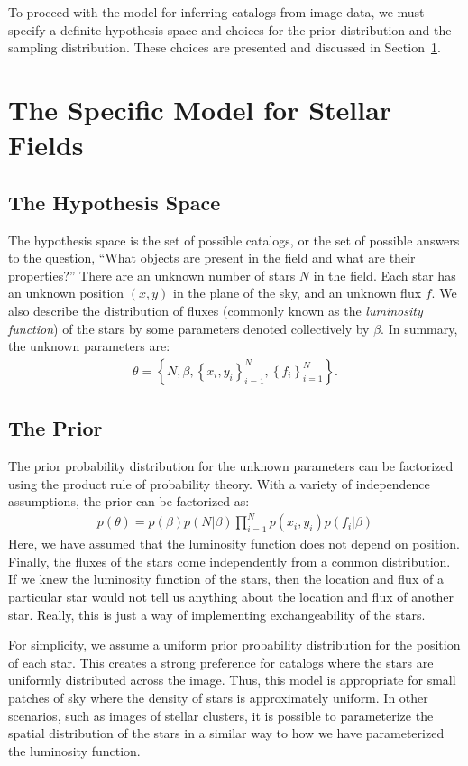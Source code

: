 \documentclass[manuscript]{aastex}
\begin{document}
To proceed with the model for inferring catalogs from image data, we must
specify a definite hypothesis space and choices for the prior distribution
and the sampling distribution. These choices are presented and discussed in
Section~\ref{sec:model}.

\section{The Specific Model for Stellar Fields}\label{sec:model}
\subsection{The Hypothesis Space}
The hypothesis space is the set of possible catalogs, or the set of possible
answers to the question, ``What objects are present in the field and
what are their properties?'' There are an unknown number of stars
$N$ in the field. Each star has an unknown
position $(x,y)$ in the plane of the sky, and an unknown flux $f$. We also
describe the distribution of fluxes (commonly known as the {\it luminosity
function}) of the stars by some parameters denoted collectively by $\beta$.
In summary, the unknown parameters are:
\begin{eqnarray}
\theta = \left\{N, \beta, \left\{x_i, y_i\right\}_{i=1}^N, 
\left\{f_i\right\}_{i=1}^N\right\}.
\end{eqnarray}

\subsection{The Prior}
The prior probability distribution for the unknown parameters can be factorized
using the product rule of probability theory.
With a variety of independence assumptions, the prior
can be factorized as:
\begin{eqnarray}
p(\theta) = p(\beta)p(N|\beta)\prod_{i=1}^N p(x_i, y_i)
p(f_i | \beta) 
\end{eqnarray}
Here, we have assumed that the luminosity function does not depend on position.
Finally, the fluxes of the stars come independently from
a common distribution. If we knew the luminosity
function of the stars, then the location and flux of a particular star would
not tell us anything about the location and flux of another star. Really, this
is just a way of implementing exchangeability of the stars.

For simplicity, we assume a uniform prior probability distribution for the
position of each star. This creates a strong preference for catalogs where
the stars are uniformly distributed across the image. Thus, this model is
appropriate for small patches of sky where the density of stars is approximately
uniform. In other scenarios, such as images of stellar clusters, it is possible
to parameterize the spatial distribution of the stars in a similar way to how
we have parameterized the luminosity function.
\end{document}
